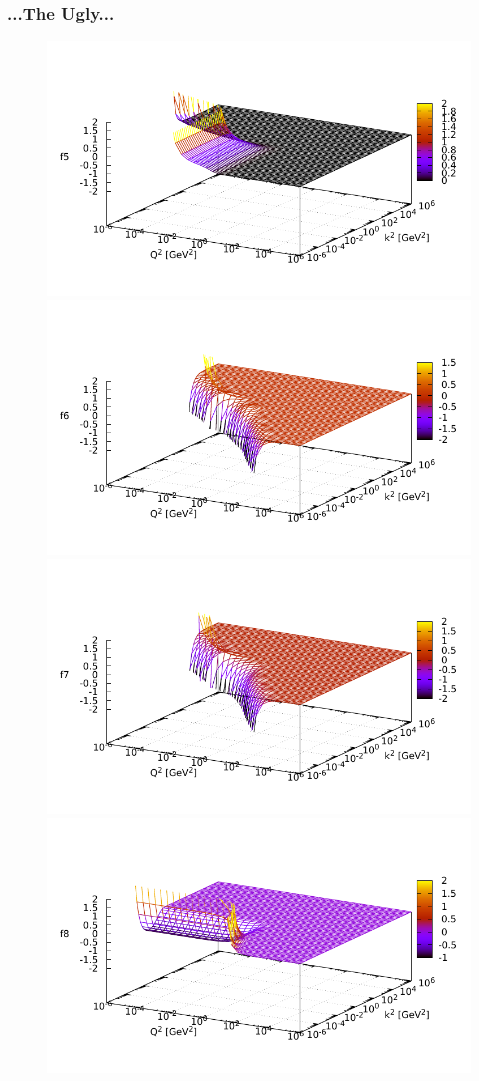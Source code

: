 \begin{frame}
    \frametitle{...The Ugly...}
    \begin{figure}
        \centering
        \includegraphics[width=0.45\linewidth]{graphics/plots_scaled/f5_dse_pv}
        \includegraphics[width=0.45\linewidth]{graphics/plots_scaled/f6_dse_pv}
        \includegraphics[width=0.45\linewidth]{graphics/plots_scaled/f7_dse_pv}
        \includegraphics[width=0.45\linewidth]{graphics/plots_scaled/f8_dse_pv}
        \label{fig:fs2}
    \end{figure}
\end{frame}
